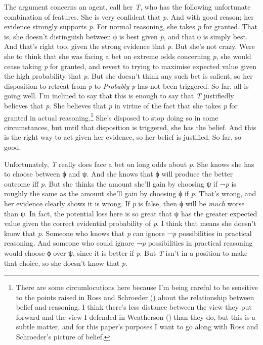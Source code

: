 \documentclass[
  10pt,
  letterpaper,
  DIV=11,
  numbers=noendperiod,
  twoside]{scrartcl}
\begin{document}
The argument concerns an agent, call her \emph{T}, who has the following
unfortunate combination of features. She is very confident that
\emph{p}. And with good reason; her evidence strongly supports \emph{p}.
For normal reasoning, she takes \emph{p} for granted. That is, she
doesn't distinguish between ϕ is best given \emph{p}, and that ϕ is
simply best. And that's right too, given the strong evidence that
\emph{p}. But she's not crazy. Were she to think that she was facing a
bet on extreme odds concerning \emph{p}, she would cease taking \emph{p}
for granted, and revert to trying to maximise expected value given the
high probability that \emph{p}. But she doesn't think any such bet is
salient, so her disposition to retreat from \emph{p} to \emph{Probably
p} has not been triggered. So far, all is going well. I'm inclined to
say that this is enough to say that \emph{T} justifiedly believes that
\emph{p}. She believes that \emph{p} in virtue of the fact that she
takes \emph{p} for granted in actual reasoning.\footnote{There are some
  circumlocutions here because I'm being careful to be sensitive to the
  points raised in Ross and Schroeder
  () about the relationship
  between belief and reasoning. I think there's less distance between
  the view they put forward and the view I defended in Weatherson
  () than they do, but this is
  a subtle matter, and for this paper's purposes I want to go along with
  Ross and Schroeder's picture of belief.} She's disposed to stop doing
so in some circumstances, but until that disposition is triggered, she
has the belief. And this is the right way to act given her evidence, so
her belief is justified. So far, so good.

Unfortunately, \emph{T} really does face a bet on long odds about
\emph{p}. She knows she has to choose between ϕ and ψ. And she knows
that ϕ will produce the better outcome iff \emph{p}. But she thinks the
amount she'll gain by choosing ψ if ¬\emph{p} is roughly the same as the
amount she'll gain by choosing ϕ if \emph{p}. That's wrong, and her
evidence clearly shows it is wrong. If \emph{p} is false, then ϕ will be
\emph{much} worse than ψ. In fact, the potential loss here is so great
that ψ has the greater expected value given the correct evidential
probability of \emph{p}. I think that means she doesn't know that
\emph{p}. Someone who knows that \emph{p} can ignore ¬\emph{p}
possibilities in practical reasoning. And someone who could ignore
¬\emph{p} possibilities in practical reasoning would choose ϕ over ψ,
since it is better if \emph{p}. But \emph{T} isn't in a position to make
that choice, so she doesn't know that \emph{p}.
\end{document}
